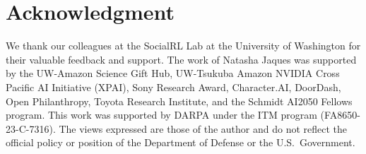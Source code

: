 \section*{Acknowledgment}
We thank our colleagues at the SocialRL Lab at the University of Washington for their valuable feedback and support. The work of Natasha Jaques was supported by the UW-Amazon Science Gift Hub, UW-Tsukuba Amazon NVIDIA Cross Pacific AI Initiative (XPAI), Sony Research Award, Character.AI, DoorDash, Open Philanthropy, Toyota Research Institute, and the Schmidt AI2050 Fellows program. This work was supported by DARPA under the ITM program (FA8650-23-C-7316). The views expressed are those of the author and do not reflect the official policy or position of the Department of Defense or the U.S.~Government.

